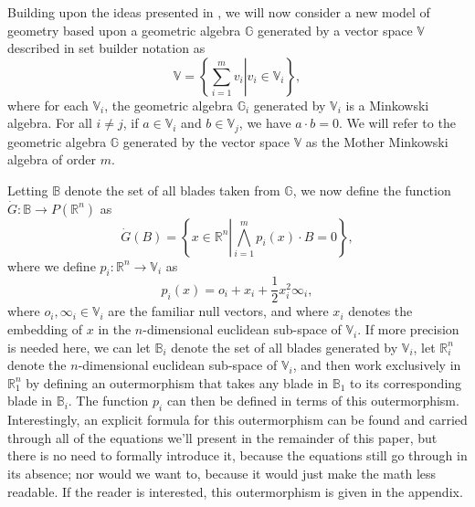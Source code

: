 \documentclass{ecgd-l}
\theoremstyle{definition}
\theoremstyle{remark}
\numberwithin{equation}{section}
\newcommand{\R}{\mathbb{R}}
\newcommand{\B}{\mathbb{B}}
\newcommand{\G}{\mathbb{G}}
\newcommand{\V}{\mathbb{V}}
\newcommand{\Gd}{\dot{G}}
\newcommand{\nvai}{\infty}
\newcommand{\nvao}{o}
\begin{document}
Building upon the ideas presented in \cite{DoranHestenes93}, we will now consider
a new model of geometry based upon a geometric algebra $\G$
generated by a vector space $\V$ described in set builder notation as
\begin{equation*}
\V = \left\{\left.\sum_{i=1}^m v_i\right|v_i\in\V_i\right\},
\end{equation*}
where for each $\V_i$, the geometric algebra $\G_i$ generated by $\V_i$
is a Minkowski algebra.  For all $i\neq j$, if $a\in\V_i$
and $b\in\V_j$, we have $a\cdot b=0$.  We will refer to the geometric algebra $\G$
generated by the vector space $\V$ as the Mother Minkowski algebra of order $m$.

Letting $\B$ denote the set
of all blades taken from $\G$, we now define the function $\Gd:\B\to P(\R^n)$ as
\begin{equation}\label{equ_Gd}
\Gd(B) = \left\{x\in\R^n\left|\bigwedge_{i=1}^m p_i(x)\cdot B=0\right\}\right.,
\end{equation}
where we define $p_i:\R^n\to\V_i$ as
\begin{equation}\label{equ_p_i}
p_i(x) = \nvao_i + x_i + \frac{1}{2}x_i^2\nvai_i,
\end{equation}
where $\nvao_i,\nvai_i\in\V_i$ are the familiar null vectors, and where $x_i$ denotes the embedding
of $x$ in the $n$-dimensional euclidean sub-space of $\V_i$.  If more precision is needed here,
we can let $\B_i$ denote the set of all blades generated by $\V_i$,
let $\R_i^n$ denote the $n$-dimensional euclidean sub-space of $\V_i$, and then
work exclusively in $\R_1^n$ by defining an outermorphism that takes any blade in $\B_1$
to its corresponding blade in $\B_i$.  The function $p_i$ can then be defined in terms
of this outermorphism.  Interestingly, an explicit formula for this outermorphism can be found and carried through
all of the equations we'll present in the remainder of this paper, but there is no need to
formally introduce it, because the equations still go through in its absence; nor would we want to,
because it would just make the math less readable.  If the reader is
interested, this outermorphism is given in the appendix.
\end{document}
